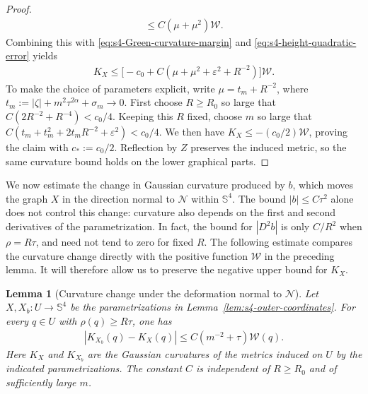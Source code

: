 \documentclass[a4paper,11pt,oneside,reqno]{amsart}
\numberwithin{equation}{section}
\newtheorem{lemma}[theorem]{Lemma}
\theoremstyle{definition}
\begin{document}
\begin{proof}
\begin{align*}
        \leq C(\mu+\mu^2)\mathcal W.
    \end{align*}
    Combining this with
    \eqref{eq:s4-Green-curvature-margin} and
    \eqref{eq:s4-height-quadratic-error} yields
    \begin{align*}
        K_X\leq
        \bigl[-c_0+C(\mu+\mu^2+\varepsilon^2+R^{-2})\bigr]
        \mathcal W.
    \end{align*}
    To make the choice of parameters explicit, write
    $\mu=t_m+R^{-2}$, where
    $t_m:=|\zeta|+m^2\tau^{2\alpha}+\sigma_m\to0$.
    First choose $R\geq R_0$ so large that
    $C(2R^{-2}+R^{-4})<c_0/4$.
    Keeping this $R$ fixed, choose $m$ so large that
    $C(t_m+t_m^2+2t_mR^{-2}+\varepsilon^2)<c_0/4$.
    We then have $K_X\leq-(c_0/2)\mathcal W$, proving
    the claim with $c_*:=c_0/2$.
    Reflection by $Z$ preserves the induced metric, so the
    same curvature bound holds on the lower graphical parts.
\end{proof}

We now estimate the change in Gaussian curvature produced by
$b$, which moves the graph $X$ in the direction normal to
$\mathcal N$ within $\mathbb S^4$. The bound $|b|\leq C\tau^2$
alone does not control this change: curvature also depends on
the first and second derivatives of the parametrization. In
fact, the bound for $|D^2b|$ is only $C/R^2$ when
$\rho=R\tau$, and need not tend to zero for fixed $R$.
The following estimate compares the curvature change directly
with the positive function $\mathcal W$ in the preceding
lemma. It will therefore allow us to preserve the negative
upper bound for $K_X$.

\begin{lemma}[Curvature change under the deformation normal to $\mathcal N$]
    \label{lem:s4-transverse-curvature-comparison}
    Let $X,X_b:U\to\mathbb S^4$ be the parametrizations in
    Lemma~\ref{lem:s4-outer-coordinates}. For every $q\in U$
    with $\rho(q)\geq R\tau$, one has
    \begin{align}
        \label{eq:s4-transverse-curvature-comparison}
        |K_{X_b}(q)-K_X(q)|
        \leq C(m^{-2}+\tau)\mathcal W(q).
    \end{align}
    Here $K_X$ and $K_{X_b}$ are the Gaussian curvatures of
    the metrics induced on $U$ by the indicated
    parametrizations. The constant $C$ is independent of
    $R\geq R_0$ and of sufficiently large $m$.
\end{lemma}
\end{document}
